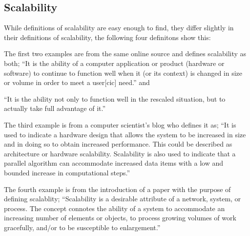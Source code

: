 \subsection{Scalability}
While definitions of scalability are easy enough to find, they differ slightly in their definitions of scalability, the following four definitons show this:

The first two examples are from the same online source and defines scalability as both;
``It is the ability of a computer application or product (hardware or software) to continue to function well when it (or its context) is changed in size or volume in order to meet a user[cic] need.''
and

``It is the ability not only to function well in the rescaled situation, but to actually take full advantage of it.''
\cite{scaleDef1}

The third example is from a computer scientist's blog who defines it as;
``It is used to indicate a hardware design that allows the system to be increased in size and in doing so to obtain increased performance. This could be described as architecture or hardware scalability. Scalability is also used to indicate that a parallel algorithm can accommodate increased data items with a low and bounded increase in computational steps.''
\cite{scaleDef2}

The fourth example is from the introduction of a paper with the purpose of defining scalablity;
``Scalability is a desirable attribute of a network, system, or
process. The concept connotes the ability of a system to
accommodate an increasing number of elements or objects, to
process growing volumes of work gracefully, and/or to be
susceptible to enlargement.''
\cite{scaleDef3}

